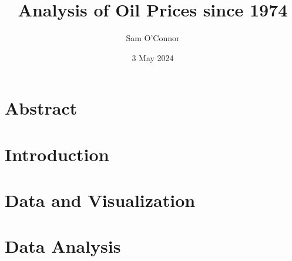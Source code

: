 \documentclass{article}
\author{Sam O'Connor}
\title{Analysis of Oil Prices since 1974}
\date{3 May 2024}
\begin{document}
\maketitle

\section{Abstract}


\section{Introduction}


\section{Data and Visualization}


\section{Data Analysis}
\end{document}
